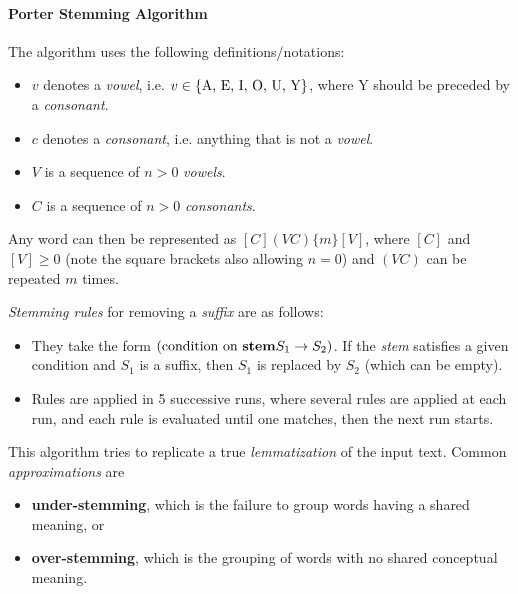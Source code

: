 \paragraph{Porter Stemming Algorithm}
The algorithm uses the following definitions/notations:
\begin{itemize}
	\item \(v\) denotes a \emph{vowel}, i.e. \(v \in \{\textnormal{A, E, I, O, U, Y}\}\), where Y should be preceded by a \emph{consonant}.
	\item \(c\) denotes a \emph{consonant}, i.e. anything that is not a \emph{vowel}.
	\item \(V\) is a sequence of \(n > 0\) \emph{vowels}.
	\item \(C\) is a sequence of \(n > 0\) \emph{consonants}.
\end{itemize}
Any word can then be represented as \([C](VC)\{m\}[V]\), where \([C]\) and \([V] \geq 0\) (note the square brackets also allowing \(n = 0\)) and \((VC)\) can be repeated \(m\) times.

\emph{Stemming rules} for removing a \emph{suffix} are as follows:
\begin{itemize}
	\item They take the form \((\textnormal{condition on \textbf{stem}}S_1 \to S_2)\). If the \emph{stem} satisfies a given condition and \(S_1\) is a suffix, then \(S_1\) is replaced by \(S_2\) (which can be empty).
	\item Rules are applied in 5 successive runs, where several rules are applied at each run, and each rule is evaluated until one matches, then the next run starts.
\end{itemize}

This algorithm tries to replicate a true \emph{lemmatization} of the input text.
Common \emph{approximations} are
\begin{itemize}
	\item \textbf{under-stemming}, which is the failure to group words having a shared meaning, or
	\item \textbf{over-stemming}, which is the grouping of words with no shared conceptual meaning.
\end{itemize}
